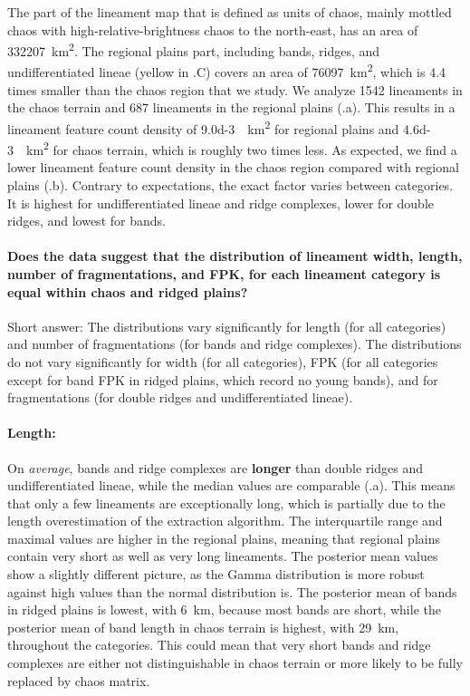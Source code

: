 
The part of the lineament map that is defined as units of chaos, mainly mottled chaos with high-relative-brightness chaos to the north-east, has an area of \qty{332207}{\km^2}. The regional plains part, including bands, ridges, and undifferentiated lineae (yellow in .C) covers an area of \qty{76097}{\km^2}, which is 4.4 times smaller than the chaos region that we study. 
We analyze 1542 lineaments in the chaos terrain and 687 lineaments in the regional plains (.a). This results in a lineament feature count density of \qty{9.0d-3}{\per\km^2} for regional plains and \qty{4.6d-3}{\per\km^2} for chaos terrain, which is roughly two times less. As expected, we find a lower lineament feature count density in the chaos region compared with regional plains (.b). Contrary to expectations, the exact factor varies between categories. It is highest for undifferentiated lineae and ridge complexes, lower for double ridges, and lowest for bands. 

\paragraph{\textbf{Does the data suggest that the distribution of lineament width, length, number of fragmentations, and FPK, for each lineament category is equal within chaos and ridged plains?}}\label{sec:Q2_width_length_FPK}
Short answer: The distributions vary significantly for length (for all categories) and number of fragmentations (for bands and ridge complexes). The distributions do not vary significantly for width (for all categories), FPK (for all categories except for band FPK in ridged plains, which record no young bands), and for fragmentations (for double ridges and undifferentiated lineae).

\paragraph{Length:} On \textit{average}, bands and ridge complexes are \textbf{longer} than double ridges and undifferentiated lineae, while the median values are comparable (.a). This means that only a few lineaments are exceptionally long, which is partially due to the length overestimation of the extraction algorithm. The interquartile range and maximal values are higher in the regional plains, meaning that regional plains contain very short as well as very long lineaments. The posterior mean values show a slightly different picture, as the Gamma distribution is more robust against high values than the normal distribution is. The posterior mean of bands in ridged plains is lowest, with 6~km, because most bands are short, while the posterior mean of band length in chaos terrain is highest, with 29~km, throughout the categories. This could mean that very short bands and ridge complexes are either not distinguishable in chaos terrain or more likely to be fully replaced by chaos matrix.


